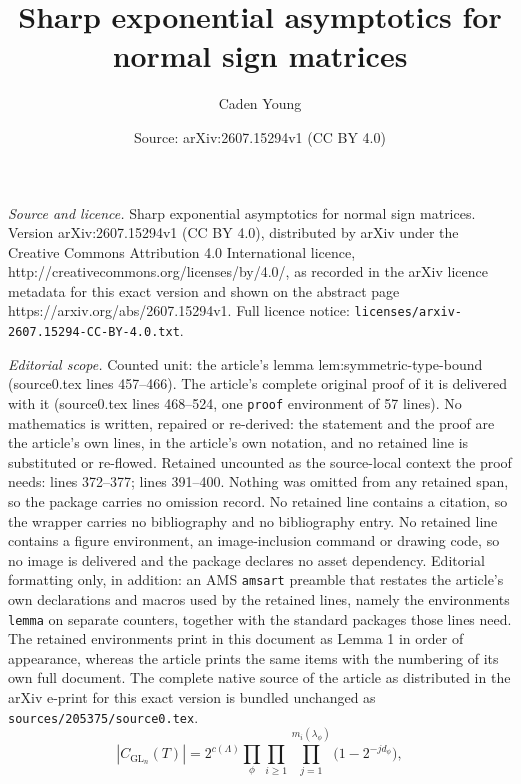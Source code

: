 \documentclass[10pt,a4paper]{amsart}
\title{Sharp exponential asymptotics for normal sign matrices}
\author{Caden Young}
\date{Source: arXiv:2607.15294v1 (CC BY 4.0)}
\newcommand{\GL}{\operatorname{GL}}
\begin{document}
\maketitle

\noindent\emph{Source and licence.} Sharp exponential asymptotics for normal sign matrices. Version arXiv:2607.15294v1 (CC BY 4.0), distributed by arXiv under the Creative Commons Attribution 4.0 International licence, http://creativecommons.org/licenses/by/4.0/, as recorded in the arXiv licence metadata for this exact version and shown on the abstract page https://arxiv.org/abs/2607.15294v1. Full licence notice: \texttt{licenses/arxiv-2607.15294-CC-BY-4.0.txt}.\par\smallskip

\noindent\textit{Editorial scope.} Counted unit: the article's lemma lem:symmetric-type-bound (source0.tex lines 457--466). The article's complete original proof of it is delivered with it (source0.tex lines 468--524, one \texttt{proof} environment of 57 lines). No mathematics is written, repaired or re-derived: the statement and the proof are the article's own lines, in the article's own notation, and no retained line is substituted or re-flowed.  Retained uncounted as the source-local context the proof needs: lines 372--377; lines 391--400.  Nothing was omitted from any retained span, so the package carries no omission record.  No retained line contains a citation, so the wrapper carries no bibliography and no bibliography entry.  No retained line contains a figure environment, an image-inclusion command or drawing code, so no image is delivered and the package declares no asset dependency.  Editorial formatting only, in addition: an AMS \texttt{amsart} preamble that restates the article's own declarations and macros used by the retained lines, namely the environments \texttt{lemma} on separate counters, together with the standard packages those lines need.  The retained environments print in this document as Lemma 1 in order of appearance, whereas the article prints the same items with the numbering of its own full document.  The complete native source of the article as distributed in the arXiv e-print for this exact version is bundled unchanged as \texttt{sources/205375/source0.tex}.
\begin{equation}\label{eq:gl-centralizer-formula}
        |C_{\GL_n}(T)|
        =2^{c(\Lambda)}
        \prod_\phi\prod_{i\geq1}\prod_{j=1}^{m_i(\lambda_\phi)}
        \bigl(1-2^{-jd_\phi}\bigr),
\end{equation}
\end{document}
